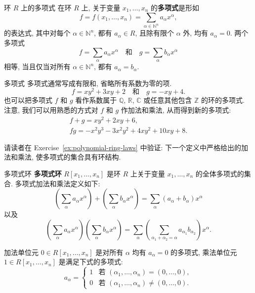 \begin{Definition}{环 \textmd{$R$} 上的多项式}\label{def:polynomial-over-ring}
  在环 $R$ 上, 关于变量 $x_{1},\ldots,x_{n}$ 的\textbf{多项式}是形如
  \[
    f=f(x_{1},\ldots,x_{n})=\sum_{\alpha\in\mathbb{N}^{n}}a_{\alpha}x^{\alpha},
  \]
  的表达式, 其中对每个 $\alpha\in\mathbb{N}^{n}$, 都有 $a_{\alpha}\in R$, 且除有限个 $\alpha$ 外, 均有 $a_{\alpha}=0$. 两个多项式
  \[
    f=\sum_{\alpha}a_{\alpha}x^{\alpha}
    \quad\text{和}\quad
    g=\sum_{\alpha}b_{\alpha}x^{\alpha}
  \]
  相等, 当且仅当对所有 $\alpha\in\mathbb{N}^{n}$, 都有 $a_{\alpha}=b_{\alpha}$.
\end{Definition}

\begin{Example}{多项式}\label{ex:polynomials-over-integers}
    {多项式通常写成有限和, 省略所有系数为零的项.}
  \[
    f=xy^{2}+3xy+2
    \quad\text{和}\quad
    g=-xy+4.
  \]
  也可以把多项式 $f$ 和 $g$ 看作系数属于 $\mathbb{Q}$, $\mathbb{R}$, $\mathbb{C}$ 或任意其他包含 $\mathbb{Z}$ 的环的多项式.
  注意, 我们可以用熟悉的方式对 $f$ 和 $g$ 作加法和乘法, 从而得到新的多项式:
  \[
    \begin{gathered}
      f+g=xy^{2}+2xy+6,\\
      fg=-x^{2}y^{3}-3x^{2}y^{2}+4xy^{2}+10xy+8.
    \end{gathered}
  \]
\end{Example}

请读者在 Exercise~\ref{ex:polynomial-ring-laws} 中验证: 下一个定义中严格给出的加法和乘法, 使多项式的集合具有环结构.

\begin{Definition}{多项式环}\label{def:polynomial-ring}
  \textbf{多项式环} $R[x_{1},\ldots,x_{n}]$ 是环 $R$ 上关于变量 $x_{1},\ldots,x_{n}$ 的全体多项式的集合. 多项式加法和乘法定义如下:
  \[
    \left(\sum_{\alpha}a_{\alpha}x^{\alpha}\right)
    +\left(\sum_{\alpha}b_{\alpha}x^{\alpha}\right)
    =\sum_{\alpha}(a_{\alpha}+b_{\alpha})x^{\alpha}
  \]
  以及
  \[
    \left(\sum_{\alpha}a_{\alpha}x^{\alpha}\right)
    \left(\sum_{\alpha}b_{\alpha}x^{\alpha}\right)
    =\sum_{\alpha}\left(\sum_{\alpha_{1}+\alpha_{2}=\alpha}
      a_{\alpha_{1}}b_{\alpha_{2}}\right)x^{\alpha}.
  \]
\end{Definition}

加法单位元 $0\in R[x_{1},\ldots,x_{n}]$ 是对所有 $\alpha$ 均有 $a_{\alpha}=0$ 的多项式, 乘法单位元 $1\in R[x_{1},\ldots,x_{n}]$ 是满足下式的多项式:
\[
  a_{\alpha}=
  \begin{cases}
    1 & \text{若 }(\alpha_{1},\ldots,\alpha_{n})=(0,\ldots,0),\\
    0 & \text{若 }(\alpha_{1},\ldots,\alpha_{n})\ne(0,\ldots,0).
  \end{cases}
\]
